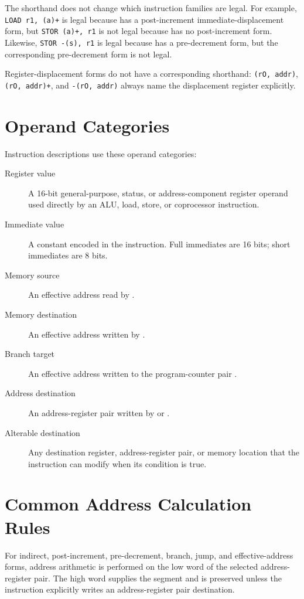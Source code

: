 The shorthand does not change which instruction families are legal. For example, \texttt{LOAD r1, (a)+} is legal
because  has a post-increment immediate-displacement form, but \texttt{STOR (a)+, r1} is not legal
because  has no post-increment form. Likewise, \texttt{STOR -(s), r1} is legal because 
has a pre-decrement form, but the corresponding pre-decrement  form is not legal.

Register-displacement forms do not have a corresponding shorthand: \texttt{(rO, addr)}, \texttt{(rO, addr)+}, and
\texttt{-(rO, addr)} always name the displacement register explicitly.

\section{Operand Categories}

Instruction descriptions use these operand categories:

\begin{description}
	\item[Register value] A 16-bit general-purpose, status, or address-component register operand used directly by an ALU, load,
	      store, or coprocessor instruction.
	\item[Immediate value] A constant encoded in the instruction. Full immediates are 16 bits; short immediates are 8 bits.
	\item[Memory source] An effective address read by .
	\item[Memory destination] An effective address written by .
	\item[Branch target] An effective address written to the program-counter pair .
	\item[Address destination] An address-register pair written by  or .
	\item[Alterable destination] Any destination register, address-register pair, or memory location that the instruction can
	      modify when its condition is true.
\end{description}

\section{Common Address Calculation Rules}

For indirect, post-increment, pre-decrement, branch, jump, and effective-address forms, address arithmetic is performed
on the low word of the selected address-register pair. The high word supplies the segment and is preserved unless the
instruction explicitly writes an address-register pair destination.

